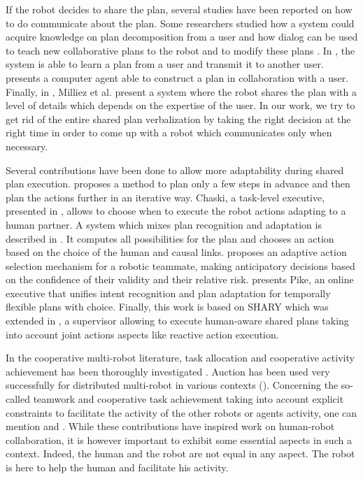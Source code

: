 \documentclass[english,a4paper,11pt,twoside]{StyleThese}
\begin{document}
If the robot decides to share the plan, several studies have been reported on how to do communicate about the plan. Some researchers studied how a system could acquire knowledge on plan decomposition from a user \cite{Mohseni2015} and how dialog can be used to teach new collaborative plans to the robot and to modify these plans \cite{petit2013coordinating}. In \cite{sorce2015proof}, the system is able to learn a plan from a user and transmit it to another user. \cite{allen2002human} presents a computer agent able to construct a plan in collaboration with a user. Finally, in \cite{milliez2016using}, Milliez et al. present a system where the robot shares the plan with a level of details which depends on the expertise of the user. In our work, we try to get rid of the entire shared plan verbalization by taking the right decision at the right time in order to come up with a robot which communicates only when necessary.

Several contributions have been done to allow more adaptability during shared plan execution. \cite{chien2000using} proposes a method to plan only a few steps in advance and then plan the actions further in an iterative way. Chaski, a task-level
executive, presented in \cite{shah2011improved}, allows to choose when to execute the robot actions adapting to a human partner. A system which mixes plan recognition and adaptation is described in \cite{levine2014concurrent}. It computes all possibilities for the plan and chooses an action based on the choice of the human and causal links. \cite{hoffman2007effects} proposes an adaptive action selection mechanism for a robotic teammate, making anticipatory decisions based on the confidence of their validity and their relative risk. \cite{karpas2015robust} presents Pike, an online executive that unifies intent recognition and plan adaptation for temporally flexible plans with choice. Finally, this work is based on SHARY \cite{clodic2009shary} which was extended in \cite{fiore2014planning}, a supervisor allowing to execute human-aware shared plans taking into account joint actions aspects like reactive action execution.

In the cooperative multi-robot literature, task allocation and cooperative activity achievement has been thoroughly investigated \cite{gerkey2004formal}. Auction has been used very successfully for distributed multi-robot in various contexts (\cite{gerkey2002sold,botelho1999m+}). 
Concerning the so-called teamwork and cooperative task achievement taking into account explicit constraints to facilitate the activity of the other robots or agents activity, one can mention \cite{tambe1997agent} and \cite{joyeux2009plan}. While these contributions have inspired work on human-robot collaboration, it is however important to exhibit some essential aspects in such a context. Indeed, the human and the robot are not equal in any aspect. The robot is here to help the human and facilitate his activity.
\end{document}
